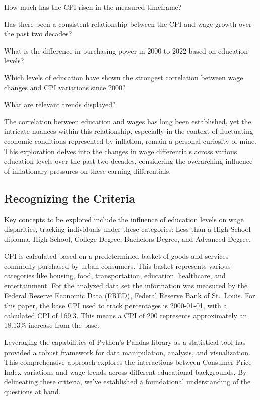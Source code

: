 \documentclass[
  letterpaper,
  DIV=11,
  numbers=noendperiod]{scrartcl}
\begin{document}
How much has the CPI risen in the measured timeframe?

Has there been a consistent relationship between the CPI and wage growth
over the past two decades?

What is the difference in purchasing power in 2000 to 2022 based on
education levels?

Which levels of education have shown the strongest correlation between
wage changes and CPI variations since 2000?

What are relevant trends displayed?

The correlation between education and wages has long been established,
yet the intricate nuances within this relationship, especially in the
context of fluctuating economic conditions represented by inflation,
remain a personal curiosity of mine. This exploration delves into the
changes in wage differentials across various education levels over the
past two decades, considering the overarching influence of inflationary
pressures on these earning differentials.

\hypertarget{recognizing-the-criteria}{%
\subsection{Recognizing the Criteria}\label{recognizing-the-criteria}}

Key concepts to be explored include the influence of education levels on
wage disparities, tracking individuals under these categories: Less than
a High School diploma, High School, College Degree, Bachelors Degree,
and Advanced Degree.

CPI is calculated based on a predetermined basket of goods and services
commonly purchased by urban consumers. This basket represents various
categories like housing, food, transportation, education, healthcare,
and entertainment. For the analyzed data set the information was
measured by the Federal Reserve Economic Data (FRED), Federal Reserve
Bank of St.~Louis. For this paper, the base CPI used to track
percentages is 2000-01-01, with a calculated CPI of 169.3. This means a
CPI of 200 represents approximately an 18.13\% increase from the base.

Leveraging the capabilities of Python's Pandas library as a statistical
tool has provided a robust framework for data manipulation, analysis,
and visualization. This comprehensive approach explores the interactions
between Consumer Price Index variations and wage trends across different
educational backgrounds. By delineating these criteria, we've
established a foundational understanding of the questions at hand.
\end{document}
